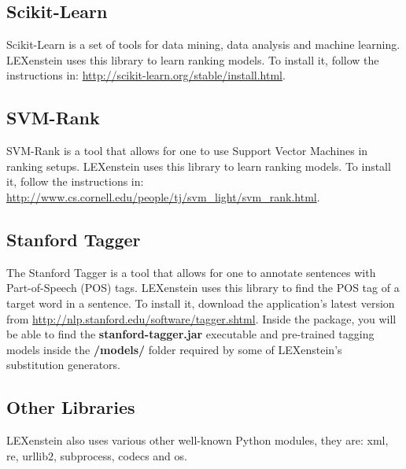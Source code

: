 \subsection{Scikit-Learn}

Scikit-Learn \cite{scikit-learn} is a set of tools for data mining, data analysis and machine learning. LEXenstein uses this library to learn ranking models. To install it, follow the instructions in: \url{http://scikit-learn.org/stable/install.html}.



\subsection{SVM-Rank}

SVM-Rank \cite{svmrank} is a tool that allows for one to use Support Vector Machines in ranking setups. LEXenstein uses this library to learn ranking models. To install it, follow the instructions in: \url{http://www.cs.cornell.edu/people/tj/svm_light/svm_rank.html}.


\subsection{Stanford Tagger}

The Stanford Tagger \cite{stanfordparser} is a tool that allows for one to annotate sentences with Part-of-Speech (POS) tags. LEXenstein uses this library to find the POS tag of a target word in a sentence. To install it, download the application's latest version from \url{http://nlp.stanford.edu/software/tagger.shtml}. Inside the package, you will be able to find the \textbf{stanford-tagger.jar} executable and pre-trained tagging models inside the \textbf{/models/} folder required by some of LEXenstein's substitution generators.



\subsection{Other Libraries}

LEXenstein also uses various other well-known Python modules, they are: xml, re, urllib$2$, subprocess, codecs and os.